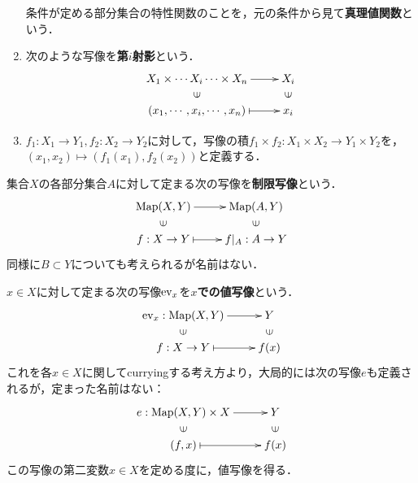 \documentclass[uplatex,dvipdfmx]{jsreport}
\begin{document}
\begin{example}
\begin{enumerate}
        条件が定める部分集合の特性関数のことを，元の条件から見て\textbf{真理値関数}という．
        \item 次のような写像を\textbf{第$i$射影}という．\[\xymatrix@R-2pc{
            X_1\times\cdots X_i\cdots\times X_n\ar[r]&X_i\\
            \rotatebox[origin=c]{90}{$\in$}&\rotatebox[origin=c]{90}{$\in$}\\
            (x_1,\cdots,x_i,\cdots,x_n)\ar@{|->}[r]&x_{i}
        }\]
        \item $f_1:X_1\to Y_1,f_2:X_2\to Y_2$に対して，写像の積$f_1\times f_2:X_1\times X_2\to Y_1\times Y_2$を，$(x_1,x_2)\mapsto (f_1(x_1),f_2(x_2))$と定義する．
    \end{enumerate}
\end{example}

\begin{definition}
	集合$X$の各部分集合$A$に対して定まる次の写像を\textbf{制限写像}という．
    \[\xymatrix@R-2pc{
        \Map(X,Y)\ar[r]&\Map(A,Y)\\
        \rotatebox[origin=c]{90}{$\in$}&\rotatebox[origin=c]{90}{$\in$}\\
        f:X\to Y\ar@{|->}[r]&f|_A:A\to Y
    }\]
    同様に$B\subset Y$についても考えられるが名前はない．
\end{definition}
\begin{definition}
	$x\in X$に対して定まる次の写像$\mathrm{ev}_x$を\textbf{$x$での値写像}という．
    \[\xymatrix@R-2pc{
        \ev_x:\Map(X,Y)\ar[r]&Y\\
        \rotatebox[origin=c]{90}{$\in$}&\rotatebox[origin=c]{90}{$\in$}\\
        f:X\to Y\ar@{|->}[r]&f(x)
    }\]
	これを各$x\in X$に関してcurryingする考え方より，大局的には次の写像$e$も定義されるが，定まった名前はない：
    \[\xymatrix@R-2pc{
        e:\Map(X,Y)\times X\ar[r]&Y\\
        \rotatebox[origin=c]{90}{$\in$}&\rotatebox[origin=c]{90}{$\in$}\\
        (f,x)\ar@{|->}[r]&f(x)
    }\]
	この写像の第二変数$x\in X$を定める度に，値写像を得る．
\end{definition}
\end{document}
